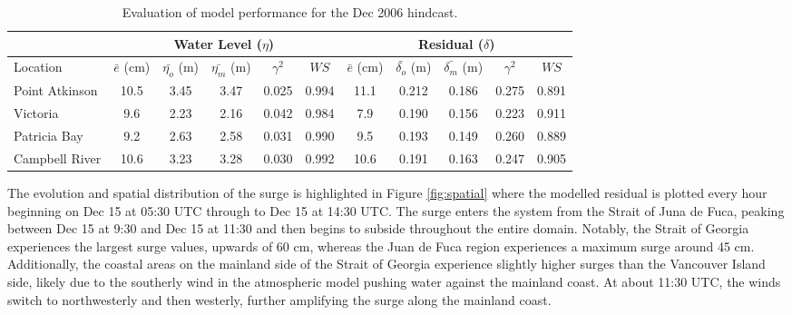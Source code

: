 \documentclass[pdftex,10pt]{article}
\begin{document}
\begin{table}[h]
\centering 
\begin{tabular}{|l |c c c c c | c c c c c|} 
\hline 
& \multicolumn{5}{|c|}{Water Level ($\eta$)}        & \multicolumn{5}{|c|}{Residual ($\delta$)} \\ 
\hline 
Location       & $\bar{e}$ (cm) & $\bar{\eta_{o}}$ (m) & $\bar{\eta_{m}}$ (m) & $\gamma^2$ & $WS$   & $\bar{e}$ (cm) & $\bar{\delta_{o}}$ (m) & $\bar{\delta_{m}}$ (m) & $\gamma^2$ & $WS$ \\
\hline 
Point Atkinson & 10.5           &  3.45                & 3.47                 &   0.025    & 0.994  & 11.1           &  0.212                 & 0.186                  &  0.275     & 0.891 \\
Victoria       &  9.6           &  2.23                & 2.16                 &   0.042    & 0.984  &  7.9           &  0.190                 & 0.156                  &  0.223     & 0.911 \\
Patricia Bay   &  9.2           &  2.63                & 2.58                 &   0.031    & 0.990  &  9.5           &  0.193                 & 0.149                  &  0.260     & 0.889 \\
Campbell River & 10.6           &  3.23                & 3.28                 &   0.030    & 0.992  & 10.6           &  0.191                 & 0.163                  &  0.247     & 0.905 \\
\hline 
\end{tabular}
\caption{Evaluation of model performance for the Dec 2006 hindcast.}
\label{tab:dec2006stat} 
\end{table}

The evolution and spatial distribution of the surge is highlighted in Figure \ref{fig:spatial} where the modelled residual is plotted every hour beginning on Dec 15 at 05:30 UTC through to Dec 15 at 14:30 UTC. The surge enters the system from the Strait of Juna de Fuca, peaking between Dec 15 at 9:30 and Dec 15 at 11:30 and then begins to subside throughout the entire domain. Notably, the Strait of Georgia experiences the largest surge values, upwards of 60 cm, whereas the Juan de Fuca region experiences a maximum surge around 45 cm. Additionally, the coastal areas on the mainland side of the Strait of Georgia experience slightly higher surges than the Vancouver Island side, likely due to the southerly wind in the atmospheric model pushing water against the mainland coast. At about 11:30 UTC, the winds switch to northwesterly and then westerly, further amplifying the surge along the mainland coast. 
\end{document}
